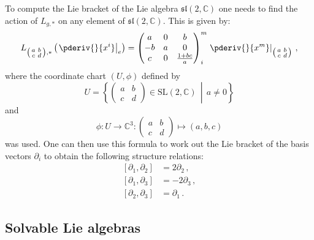     \begin{example}
        To compute the Lie bracket of the Lie algebra $\mathfrak{sl}(2,\mathbb{C})$ one needs to find the action of $L_{g,*}$ on any element of $\mathfrak{sl}(2,\mathbb{C})$. This is given by:
        \begin{gather}
            L_{\left(\begin{smallmatrix}a&b\\c&d\end{smallmatrix}\right),*}\left(\left.\pderiv{}{x^i}\right|_e\right)
            = \begin{pmatrix}a&0&b\\-b&a&0\\c&0&\frac{1+bc}{a}\end{pmatrix}^m_i\left.\pderiv{}{x^m}\right|_{\left(\begin{smallmatrix}a&b\\c&d\end{smallmatrix}\right)}\,,
        \end{gather}
        where the coordinate chart $(U,\phi)$ defined by \[U = \left\{\begin{pmatrix}a&b\\c&d\end{pmatrix}\in\mathrm{SL}(2,\mathbb{C})\,\middle\vert\,a\neq0\right\}\] and \[\phi:U\rightarrow\mathbb{C}^3:\begin{pmatrix}a&b\\c&d\end{pmatrix}\mapsto(a,b,c)\] was used. One can then use this formula to work out the Lie bracket of the basis vectors $\partial_i$ to obtain the following structure relations:
        \begin{align}
            \label{lie:sl2c_lie_brackets}
            [\partial_1,\partial_2] &= 2\partial_2\,,\nonumber\\
            [\partial_1,\partial_3] &= -2\partial_3\,,\\
            [\partial_2,\partial_3] &= \partial_1\,.\nonumber
        \end{align}
    \end{example}

\subsection{Solvable Lie algebras}


